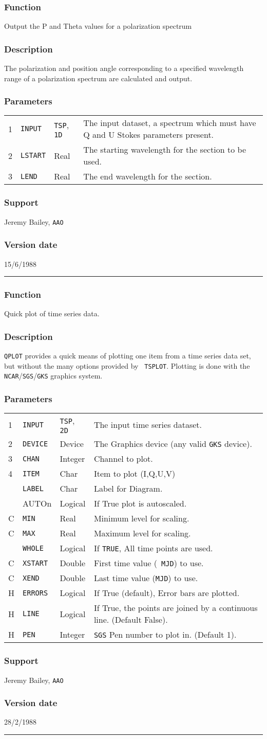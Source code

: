 \documentclass[11pt,twoside,nolof,noabs]{starlink}
\newcommand{\manroutine}[3]{\ssttitle{#1}{#2}}
\newenvironment{manroutinedescription}{}{\par{}\rule{\textwidth}{0.5mm}}
\newcommand{\manroutineitem}[2]{\subsubsection*{#1}#2\par{}}
\newenvironment{manparametertable}{\begin{tabular}{lllp{80mm}}}%
{\end{tabular}}
\newcommand{\manparameterentry}[3]{\\#1 & #2 & #3 & }
\providecommand{\mantt}[1]{\texttt{#1}}
\begin{document}
\begin{manroutinedescription}
\manroutineitem{Function}{}
        Output the P and Theta values for a polarization spectrum

\manroutineitem{Description}{}
        The polarization and position angle corresponding to a
        specified wavelength range of a polarization spectrum are
        calculated and output.

\manroutineitem{Parameters}{}
\begin{manparametertable}
\manparameterentry{1}{{\mantt{INPUT}}}{{\mantt{TSP}}, {\mantt{1D}}}
The input dataset, a spectrum which must have Q and U Stokes parameters present.
\manparameterentry{2}{{\mantt{LSTART}}}{Real}
The starting wavelength for the section to be used.
\manparameterentry{3}{{\mantt{LEND}}}{Real}
The end wavelength for the section.

\end{manparametertable}
\manroutineitem{Support}{Jeremy Bailey, {\mantt{AAO}}}
\manroutineitem{Version date}{15/6/1988}
\end{manroutinedescription}
\manroutine{{\mantt{QPLOT}}}{Quick plot of time series data.}{QPLOT}
\begin{manroutinedescription}
\manroutineitem{Function}{}
        Quick plot of time series data.

\manroutineitem{Description}{}
        {\mantt{QPLOT}} provides a quick means of plotting one item from a time
        series data set, but without the many options provided by {\mantt{%
TSPLOT}}.
        Plotting is done with the {\mantt{NCAR}}/{\mantt{SGS}}/{\mantt{GKS}} %
graphics system.

\manroutineitem{Parameters}{}
\begin{manparametertable}
\manparameterentry{1}{{\mantt{INPUT}}}{{\mantt{TSP}}, {\mantt{2D}}}  The input %
time series dataset.
\manparameterentry{2}{{\mantt{DEVICE}}}{Device}   The Graphics device (any %
valid {\mantt{GKS}} device).
\manparameterentry{3}{{\mantt{CHAN}}}{Integer}  Channel to plot.
\manparameterentry{4}{{\mantt{ITEM}}}{Char}     Item to plot (I,Q,U,V)
\manparameterentry{}{{\mantt{LABEL}}}{Char}     Label for Diagram.
\manparameterentry{}{AUTOn}{Logical}  If True plot is autoscaled.
\manparameterentry{C}{{\mantt{MIN}}}{Real}     Minimum level for scaling.
\manparameterentry{C}{{\mantt{MAX}}}{Real}     Maximum level for scaling.
\manparameterentry{}{{\mantt{WHOLE}}}{Logical}  If {\mantt{TRUE}}, All time %
points are used.
\manparameterentry{C}{{\mantt{XSTART}}}{Double}   First time value ({\mantt{%
MJD}}) to use.
\manparameterentry{C}{{\mantt{XEND}}}{Double}   Last time value ({\mantt{MJD}}) %
to use.
\manparameterentry{H}{{\mantt{ERRORS}}}{Logical}  If True (default), Error %
bars are plotted.
\manparameterentry{H}{{\mantt{LINE}}}{Logical}  If True, the points are joined %
by a
                               continuous line. (Default False).
\manparameterentry{H}{{\mantt{PEN}}}{Integer}  {\mantt{SGS}} Pen number to %
plot in. (Default 1).

\end{manparametertable}
\manroutineitem{Support}{Jeremy Bailey, {\mantt{AAO}}}
\manroutineitem{Version date}{28/2/1988}
\end{manroutinedescription}
\end{document}
